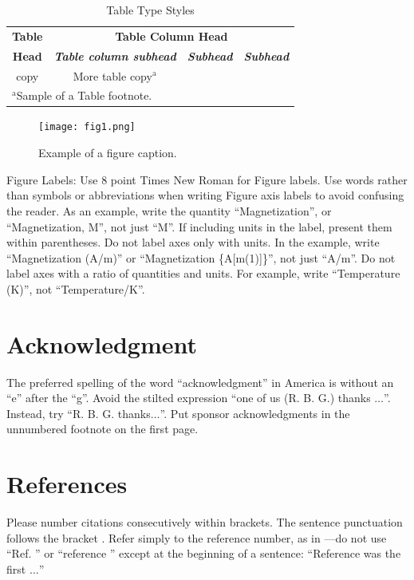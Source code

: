 \documentclass[conference]{IEEEtran}
\begin{document}
\begin{table}[htbp]
\caption{Table Type Styles}
\begin{center}
\begin{tabular}{|c|c|c|c|}
\hline
\textbf{Table}&\multicolumn{3}{|c|}{\textbf{Table Column Head}} \\
\cline{2-4} 
\textbf{Head} & \textbf{\textit{Table column subhead}}& \textbf{\textit{Subhead}}& \textbf{\textit{Subhead}} \\
\hline
copy& More table copy$^{\mathrm{a}}$& &  \\
\hline
\multicolumn{4}{l}{$^{\mathrm{a}}$Sample of a Table footnote.}
\end{tabular}
\label{tab1}
\end{center}
\end{table}

\begin{figure}[htbp]
\centerline{\texttt{[image: fig1.png]}}
\caption{Example of a figure caption.}
\label{fig}
\end{figure}

Figure Labels: Use 8 point Times New Roman for Figure labels. Use words 
rather than symbols or abbreviations when writing Figure axis labels to 
avoid confusing the reader. As an example, write the quantity 
``Magnetization'', or ``Magnetization, M'', not just ``M''. If including 
units in the label, present them within parentheses. Do not label axes only 
with units. In the example, write ``Magnetization (A/m)'' or ``Magnetization 
\{A[m(1)]\}'', not just ``A/m''. Do not label axes with a ratio of 
quantities and units. For example, write ``Temperature (K)'', not 
``Temperature/K''.

\section*{Acknowledgment}

The preferred spelling of the word ``acknowledgment'' in America is without 
an ``e'' after the ``g''. Avoid the stilted expression ``one of us (R. B. 
G.) thanks $\ldots$''. Instead, try ``R. B. G. thanks$\ldots$''. Put sponsor 
acknowledgments in the unnumbered footnote on the first page.

\section*{References}

Please number citations consecutively within brackets. The 
sentence punctuation follows the bracket \cite{b2}. Refer simply to the reference 
number, as in \cite{b3}---do not use ``Ref. \cite{b3}'' or ``reference \cite{b3}'' except at 
the beginning of a sentence: ``Reference \cite{b3} was the first $\ldots$''
\end{document}

